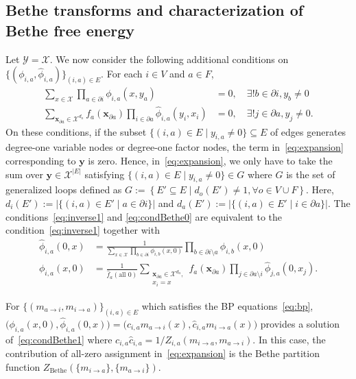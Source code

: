 \documentclass[a4paper,10pt,twoside,twocolumn,openany,final]{memoir}
\theoremstyle{plain}
\theoremstyle{definition}
\theoremstyle{remark}
\begin{document}
\subsection{Bethe transforms and characterization of Bethe free energy}
Let $\mathcal{Y}=\mathcal{X}$.
We now consider the following additional conditions on $\{(\phi_{i,a}, \hat{\phi}_{i,a})\}_{(i,a)\in E}$.
For each $i\in V$ and $a\in F$,
\begin{equation}
\begin{split}
\sum_{x\in\mathcal{X}} \prod_{a\in\partial i} \phi_{i,a}(x,y_a) &= 0,\quad \exists! b\in\partial i, y_b\ne 0\\
\sum_{\bm{x}_{\partial a}\in\mathcal{X}^{d_a}}
f_a(\bm{x}_{\partial a}) \prod_{i\in\partial a} \hat{\phi}_{i,a}(y_i, x_i)
&= 0,\quad \exists! j\in\partial a, y_j\ne 0.
\end{split}
\label{eq:condBethe0}
\end{equation}
On these conditions, if the subset $\{(i,a)\in E\mid y_{i,a} \ne 0\}\subseteq E$ of edges generates degree-one variable nodes or degree-one factor nodes,
the term in~\eqref{eq:expansion} corresponding to $\bm{y}$ is zero.
Hence, in~\eqref{eq:expansion}, we only have to take the sum over $\bm{y}\in\mathcal{X}^{|E|}$
satisfying $\{(i,a)\in E\mid y_{i,a}\ne 0\}\in G$ where
$G$ is the set of generalized loops defined as
$G := \left\{E'\subseteq E\mid d_o(E') \ne 1, \forall o\in V\cup F\right\}$.
Here, $d_i(E'):=|\{(i,a)\in E'\mid a\in\partial i\}|$ and
$d_a(E'):=|\{(i,a)\in E'\mid i\in\partial a\}|$.
The conditions~\eqref{eq:inverse1} and \eqref{eq:condBethe0}
are equivalent to the condition~\eqref{eq:inverse1} together with
\begin{equation}
\begin{split}
\hat{\phi}_{i,a}(0,x) &= \frac1{\sum_{x\in\mathcal{X}}\prod_{b\in\partial i} \phi_{i,b}(x,0)} \prod_{b\in\partial i\setminus a} \phi_{i,b}(x,0)
\\
\phi_{i,a}(x,0) &= \frac1{\hat{f}_a(\text{all } 0)}
 \sum_{\substack{\bm{x}_{\partial a}\in\mathcal{X}^{d_a},\\ x_i=x}} f_a(\bm{x}_{\partial a})\prod_{j\in\partial a\setminus i}\hat{\phi}_{j,a}(0,x_j).
\end{split}
\label{eq:condBethe1}
\end{equation}

For $\{(m_{a\to i}, m_{i\to a})\}_{(i,a)\in E}$ which satisfies the BP equations~\eqref{eq:bp}, $\bigl(\phi_{i,a}(x, 0), \hat{\phi}_{i,a}(0, x)\bigr) 
= \bigl(c_{i,a}m_{a\to i}(x), \hat{c}_{i,a}m_{i\to a}(x)\bigr)$ provides a solution of~\eqref{eq:condBethe1}
where $c_{i,a}\hat{c}_{i,a}=1/Z_{i,a}(m_{i\to a}, m_{a\to i})$.
In this case, the contribution of all-zero assignment in~\eqref{eq:expansion} is
the Bethe partition function $Z_{\mathrm{Bethe}}(\{m_{i\to a}\}, \{m_{a\to i}\})$.
\end{document}
